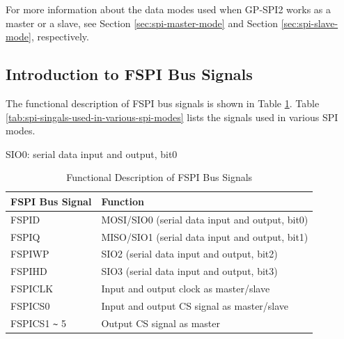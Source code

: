 \documentclass[main\_\_EN.tex]{subfiles}
\begin{document}
For more information about the data modes used when GP-SPI2 works as a master or a slave, see Section \ref{sec:spi-master-mode} and Section \ref{sec:spi-slave-mode}, respectively.

\subsection{Introduction to FSPI Bus Signals}
The functional description of FSPI bus signals is shown in Table \ref{tab:spi-bus-signals-descr}. Table \ref{tab:spi-singals-used-in-various-spi-modes} lists the signals used in various SPI modes.

\begin{ThreePartTable}

\begin{TableNotes}
    \item[a] SIO0: serial data input and output, bit0
\end{TableNotes}

\begin{longtable}[c]{|l|l|}
\caption{Functional Description of FSPI Bus Signals}
\label{tab:spi-bus-signals-descr}\\
\hline
    \rowcolor{lightgray}
    \textbf{FSPI Bus Signal}& \textbf{Function} \\
    \hline
    \endfirsthead
    \endlastfoot
    FSPID & MOSI/SIO0 (serial data input and output, bit0)\\
    \hline
    FSPIQ & MISO/SIO1 (serial data input and output, bit1) \\\hline
    FSPIWP & SIO2 (serial data input and output, bit2) \\\hline
    FSPIHD & SIO3 (serial data input and output, bit3) \\\hline
    FSPICLK & Input and output clock as master/slave \\\hline
    FSPICS0 & Input and output CS signal as master/slave \\\hline
    FSPICS1 \verb+~+ 5 & Output CS signal as master\\\hline
\end{longtable}

\end{ThreePartTable}
\end{document}
